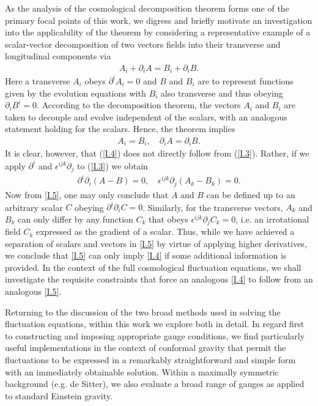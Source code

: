 As the analysis of the cosmological decomposition theorem forms one of the primary focal points of this work, we digress and briefly motivate an investigation into the applicability of the theorem by considering a representative example of a scalar-vector decomposition of two vectors fields into their transverse and longitudinal components via
%
\begin{eqnarray}
A_i+\partial_iA=B_i+\partial_iB.
\label{I.3}
\end{eqnarray}
%
Here a transverse $A_i$ obeys $\partial^i A_i = 0$ and $B$ and $B_i$ are to represent functions given by the evolution equations with $B_i$ also transverse and thus obeying $\partial_iB^i=0$. According to the decomposition theorem, the vectors $A_i$ and $B_i$ are taken to decouple and evolve independent of the scalars, with an analogous statement holding for the scalars. Hence, the theorem implies
%
\begin{eqnarray}
A_i= B_i,\quad \partial_iA=\partial_iB.
\label{I.4}
\end{eqnarray}
%
It is clear, however, that (\ref{I.4}) does not directly follow from (\ref{I.3}). Rather, if we apply $\partial^i$ and $\epsilon^{ijk}\partial_j$  to (\ref{I.3}) we obtain 
%
\begin{eqnarray}
\partial^i\partial_i(A-B)=0,\quad \epsilon^{ijk}\partial_j(A_k-B_k)=0.
\label{I.5}
\end{eqnarray}
%
Now from \eqref{I.5}, one may only conclude that $A$ and $B$ can be defined up to an arbitrary scalar $C$ obeying $\partial^i\partial_iC=0$. Similarly, for the transverse vectors, $A_k$ and $B_k$ can only differ by any function $C_k$ that obeys $\epsilon^{ijk}\partial_jC_k=0$, i.e. an irrotational field $C_k$ expressed as the gradient of a scalar. Thus, while we have achieved a separation of scalars and vectors in \eqref{I.5} by virtue of applying higher derivatives, we conclude that \eqref{I.5} can only imply \eqref{I.4} if some additional information is provided. In the context of the full cosmological fluctuation equations, we shall investigate the requisite constraints that force an analogous \eqref{I.4} to follow from an analogous \eqref{I.5}. 

Returning to the discussion of the two broad methods used in solving the fluctuation equations, within this work we explore both in detail. In regard first to constructing and imposing appropriate gauge conditions, we find particularly useful implementations in the context of conformal gravity that permit the fluctuations to be expressed in a remarkably straightforward and simple form with an immediately obtainable solution. Within a maximally symmetric background (e.g. de Sitter), we also evaluate a broad range of gauges as applied to standard Einstein gravity.

